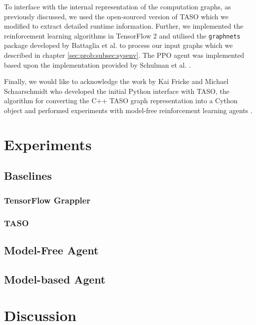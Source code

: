 To interface with the internal representation of the computation graphs, as previously discussed, we used the open-sourced version of TASO \cite{jia2019taso} which we modified to extract detailed runtime information. Further, we implemented the reinforcement learning algorithms in TensorFlow 2 \cite{tensorflow2015-whitepaper} and utilised the \texttt{graph\textunderscore nets} package developed by Battaglia et al. \cite{battaglia2018relational} to process our input graphs which we described in chapter \ref{sec:prob:subsec:sysenv}. The PPO agent was implemented based upon the implementation provided by Schulman et al. \cite{schulman2017proximal}.

Finally, we would like to acknowledge the work by Kai Fricke and Michael Schaarschmidt who developed the initial Python interface with TASO, the algorithm for  converting the C++ TASO graph representation into a Cython object and performed experiments with model-free reinforcement learning agents \cite{xflowrl2019}.

\section{Experiments}


\subsection{Baselines}


\subsubsection{TensorFlow Grappler}

\subsubsection{TASO}

\subsection{Model-Free Agent}
\label{sec:eval:subsec:mfagent}

\subsection{Model-based Agent}
\label{sec:eval:subsec:mbagent}


\section{Discussion}